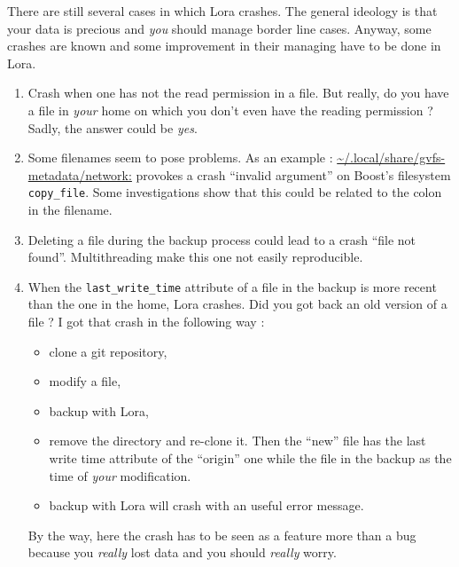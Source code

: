 \documentclass[a4paper,12pt]{article}
\newcommand{\info}[1]{\texttt{#1}}
\begin{document}
There are still several cases in which Lora crashes. The general ideology is that your data is precious and \emph{you} should manage border line cases. Anyway, some crashes are known and some improvement in their managing have to be done in Lora.
\begin{enumerate}
    \item
        Crash when one has not the read permission in a file. But really, do you have a file in \emph{your} home on which you don't even have the reading permission ? Sadly, the answer could be \emph{yes}.
    \item
        Some filenames seem to pose problems. As an example : \url{~/.local/share/gvfs-metadata/network:} provokes a crash ``invalid argument'' on Boost's filesystem \info{copy\_file}. Some investigations show that this could be related to the colon in the filename.
    \item
       Deleting a file during the backup process could lead to a crash ``file not found''. Multithreading make this one not easily reproducible.
    \item
        When the \info{last\_write\_time} attribute of a file in the backup is more recent than the one in the home, Lora crashes. Did you got back an old version of a file ? I got that crash in the following way :
        \begin{itemize}
            \item clone a git repository,
            \item modify a file,
            \item backup with Lora,
            \item remove the directory and re-clone it. Then the ``new'' file has the last write time attribute of the ``origin'' one while the file in the backup as the time of \emph{your} modification.
            \item backup with Lora will crash with an useful error message.
        \end{itemize}
        By the way, here the crash has to be seen as a feature more than a bug because you \emph{really} lost data and you should \emph{really} worry.
\end{enumerate}
\end{document}
